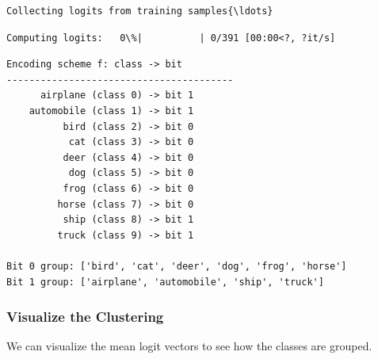 \documentclass[11pt]{article}
\begin{document}
    \begin{Verbatim}[commandchars=\\\{\}]
Collecting logits from training samples{\ldots}
    \end{Verbatim}

    
    \begin{Verbatim}[commandchars=\\\{\}]
Computing logits:   0\%|          | 0/391 [00:00<?, ?it/s]
    \end{Verbatim}

    
    \begin{Verbatim}[commandchars=\\\{\}]
Encoding scheme f: class -> bit
----------------------------------------
      airplane (class 0) -> bit 1
    automobile (class 1) -> bit 1
          bird (class 2) -> bit 0
           cat (class 3) -> bit 0
          deer (class 4) -> bit 0
           dog (class 5) -> bit 0
          frog (class 6) -> bit 0
         horse (class 7) -> bit 0
          ship (class 8) -> bit 1
         truck (class 9) -> bit 1

Bit 0 group: ['bird', 'cat', 'deer', 'dog', 'frog', 'horse']
Bit 1 group: ['airplane', 'automobile', 'ship', 'truck']
    \end{Verbatim}

    \subsubsection{Visualize the Clustering}\label{visualize-the-clustering}

We can visualize the mean logit vectors to see how the classes are
grouped.
\end{document}
